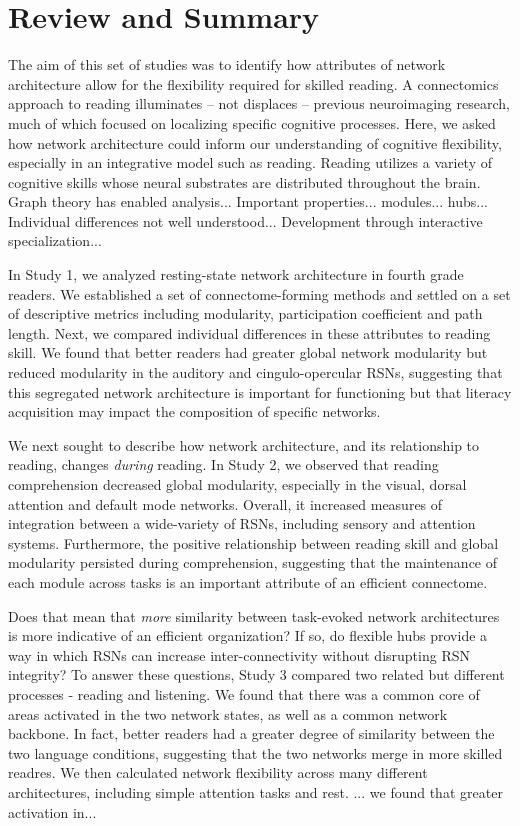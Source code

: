 \chapter{Review and Summary}

The aim of this set of studies was to identify how attributes of network architecture allow for the flexibility required for skilled reading. A connectomics approach to reading illuminates -- not displaces -- previous neuroimaging research, much of which focused on localizing specific cognitive processes. Here, we asked how network architecture could inform our understanding of cognitive flexibility, especially in an integrative model such as reading. Reading utilizes a variety of cognitive skills whose neural substrates are distributed throughout the brain. Graph theory has enabled analysis...
Important properties... modules... hubs...
Individual differences not well understood...
Development through interactive specialization...

In Study 1, we analyzed resting-state network architecture in  fourth grade readers. We established a set of connectome-forming methods and settled on a set of descriptive metrics including modularity, participation coefficient and path length. Next, we compared individual differences in these attributes to reading skill. We found that better readers had greater global network modularity but reduced modularity in the auditory and cingulo-opercular RSNs, suggesting that this segregated network architecture is important for functioning but that literacy acquisition may impact the composition of specific networks. 

We next sought to describe how network architecture, and its relationship to reading, changes \textit{during} reading. In Study 2, we observed that reading comprehension decreased global modularity, especially in the visual, dorsal attention and default mode networks. Overall, it increased measures of integration between a wide-variety of RSNs, including sensory and attention systems. Furthermore, the positive relationship between reading skill and global modularity persisted during comprehension, suggesting that the maintenance of each module across tasks is an important attribute of an efficient connectome. 

Does that mean that \textit{more} similarity between task-evoked network architectures is more indicative of an efficient organization? If so, do flexible hubs provide a way in which RSNs can increase inter-connectivity without disrupting RSN integrity?  To answer these questions, Study 3 compared two related but different processes - reading and listening. We found that there was a common core of areas activated in the two network states, as well as a common network backbone. In fact, better readers had a greater degree of similarity between the two language conditions, suggesting that the two networks merge in more skilled readres. We then calculated network flexibility across many different architectures, including simple attention tasks and rest. 
... we found that greater activation in... 


